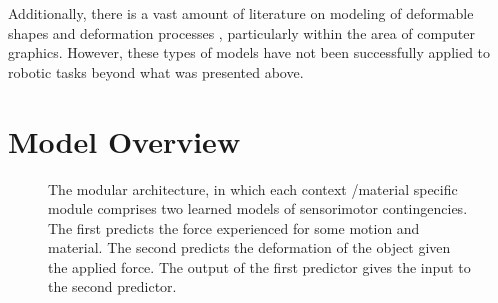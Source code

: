 \documentclass[journal]{IEEEtran}
\begin{document}
Additionally, there is a vast amount of literature on modeling of deformable shapes and deformation processes \cite{Gibson1997, McInerney1996, Montagnat2001, Moore2007review, Nealen2006review}, particularly within the area of computer graphics.  However, these types of models have not been successfully applied to robotic tasks beyond what was presented above.


\section{Model Overview}
\label{sec:model_overview}


\begin{figure}[!t]
\centering
\setlength\fboxsep{0pt}    %
\setlength\fboxrule{0.5pt} %
\caption{The modular architecture, in which each context /material specific module comprises two learned models of sensorimotor contingencies. The first predicts the force experienced for some motion and material. The second predicts the deformation of the object given the applied force. The output of the first predictor gives the input to the second predictor.}
\label{fig:system}
\end{figure}
\end{document}
